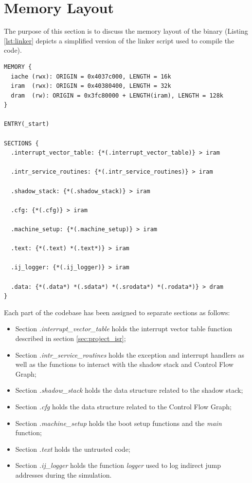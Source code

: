 \section{Memory Layout}
\label{sec:layout}

The purpose of this section is to discuss the memory layout of the binary (Listing
\ref{lst:linker} depicts a simplified version of the linker script used to compile
the code). \\ \begin{lstlisting}[style=CStyle, caption= Simplified linker script, label={lst:linker}]
MEMORY {
  iache (rwx): ORIGIN = 0x4037c000, LENGTH = 16k
  iram  (rwx): ORIGIN = 0x40380400, LENGTH = 32k
  dram  (rw): ORIGIN = 0x3fc80000 + LENGTH(iram), LENGTH = 128k
}

ENTRY(_start)

SECTIONS {
  .interrupt_vector_table: {*(.interrupt_vector_table)} > iram

  .intr_service_routines: {*(.intr_service_routines)} > iram

  .shadow_stack: {*(.shadow_stack)} > iram

  .cfg: {*(.cfg)} > iram

  .machine_setup: {*(.machine_setup)} > iram

  .text: {*(.text) *(.text*)} > iram

  .ij_logger: {*(.ij_logger)} > iram

  .data: {*(.data*) *(.sdata*) *(.srodata*) *(.rodata*)} > dram
}
\end{lstlisting}

Each part of the codebase has been assigned to separate sections as follows:
\begin{itemize}
  \item Section \textit{.interrupt\_vector\_table} holds the interrupt vector
    table function described in section \ref{sec:project_isr};

  \item Section \textit{.intr\_service\_routines} holds the exception and
    interrupt handlers as well as the functions to interact with the shadow
    stack and Control Flow Graph;

  \item Section \textit{.shadow\_stack} holds the data structure related to the
    shadow stack;

  \item Section \textit{.cfg} holds the data structure related to the Control
    Flow Graph;

  \item Section \textit{.machine\_setup} holds the boot setup functions and the
    \textit{main} function;

  \item Section \textit{.text} holds the untrusted code;

  \item Section \textit{.ij\_logger} holds the function \textit{logger} used to log
    indirect jump addresses during the simulation.
\end{itemize}

